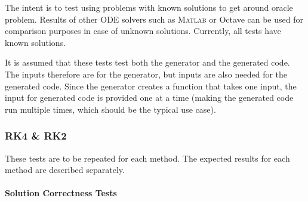 \documentclass[12pt, titlepage]{article}
\begin{document}
The intent is to test using problems with known solutions to get around oracle 
problem.
Results of other ODE solvers such as \textsc{Matlab} or Octave can be used for 
comparison purposes in case of unknown solutions.
Currently, all tests have known solutions.   

It is assumed that these tests test both the generator and the generated code. 
The inputs therefore are for the generator, but inputs are also needed for the 
generated code. Since the generator creates a function that takes one input, 
the input for generated code is provided one at a time (making the generated 
code run multiple times, which should be the typical use case).

\subsubsection{RK4 \& RK2}
These tests are to be repeated for each method. The expected results for each 
method are described separately.

\paragraph{Solution Correctness Tests}
\end{document}
